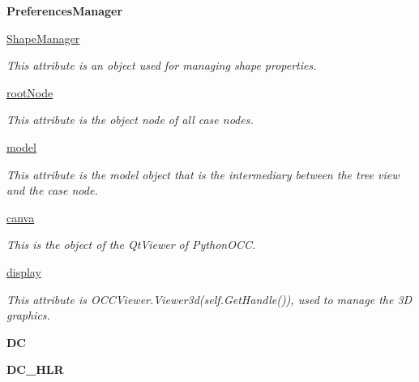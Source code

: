 \begin{DoxyCompactItemize}
{\bfseries Preferences\+Manager}
\item 
\hypertarget{a00079_a1e75ee619926a396b584090b2707b1ca}{}\label{a00079_a1e75ee619926a396b584090b2707b1ca} 
\hyperlink{a00079_a1e75ee619926a396b584090b2707b1ca}{Shape\+Manager}
\begin{DoxyCompactList}\small\item\em This attribute is an object used for managing shape properties. \end{DoxyCompactList}\item 
\hyperlink{a00079_a3cbd742c4a4a706d44d5265e19b25aaa}{root\+Node}
\begin{DoxyCompactList}\small\item\em This attribute is the object node of all case nodes. \end{DoxyCompactList}\item 
\hypertarget{a00079_ac74bebda7bd9e99df8e5d26c0b61e0bb}{}\label{a00079_ac74bebda7bd9e99df8e5d26c0b61e0bb} 
\hyperlink{a00079_ac74bebda7bd9e99df8e5d26c0b61e0bb}{model}
\begin{DoxyCompactList}\small\item\em This attribute is the model object that is the intermediary between the tree view and the case node. \end{DoxyCompactList}\item 
\hypertarget{a00079_ab277fbfb8af6b2ef9aff8d06c9f5cc82}{}\label{a00079_ab277fbfb8af6b2ef9aff8d06c9f5cc82} 
\hyperlink{a00079_ab277fbfb8af6b2ef9aff8d06c9f5cc82}{canva}
\begin{DoxyCompactList}\small\item\em This is the object of the Qt\+Viewer of Python\+O\+CC. \end{DoxyCompactList}\item 
\hyperlink{a00079_abe828f3ea500c70a4abe0f376b6d8dc4}{display}
\begin{DoxyCompactList}\small\item\em This attribute is O\+C\+C\+Viewer.\+Viewer3d(self.\+Get\+Handle()), used to manage the 3D graphics. \end{DoxyCompactList}\item 
\hypertarget{a00079_a8d53bb9fe024d3235652a6233d0d61a8}{}\label{a00079_a8d53bb9fe024d3235652a6233d0d61a8} 
{\bfseries DC}
\item 
\hypertarget{a00079_a62af2479e8c1b0d3405a6122ea2be116}{}\label{a00079_a62af2479e8c1b0d3405a6122ea2be116} 
{\bfseries D\+C\+\_\+\+H\+LR}
\item 
\hypertarget{a00079_a04f16a810669c721b389767d47c08c8f}{}\label{a00079_a04f16a810669c721b389767d47c08c8f} 

\end{DoxyCompactItemize}
